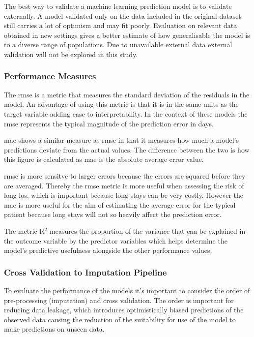 \documentclass[11pt]{article}
\begin{document}
The best way to validate a machine learning prediction model is to validate externally. A model validated only on the data included in the original dataset still carries a lot of optimism and may fit poorly. Evaluation on relevant data obtained in new settings gives a better estimate of how generalisable the model is to a diverse range of populations\cite{Bleeker2003}. Due to unavailable external data external validation will not be explored in this study.

\subsubsection{Performance Measures}

The \gls{rmse} is a metric that measures the standard deviation of the residuals in the model. An advantage of using this metric is that it is in the same units as the target variable adding ease to interpretability. In the context of these models the \gls{rmse} represents the typical magnitude of the prediction error in days\cite{Hodson2022}. 

\gls{mae} shows a similar measure as \gls{rmse} in that it measures how much a model's predictions deviate from the actual values. The difference between the two is how this figure is calculated as \gls{mae} is the absolute average error value. 

\gls{rmse} is more sensitve to larger errors because the errors are squared before they are averaged. Thereby the \gls{rmse} metric is more useful when assessing the risk of long \gls{los}, which is important because long stays can be very costly. However the \gls{mae} is more useful for the aim of estimating the average error for the typical patient because long stays will not so heavily affect the prediction error.

The metric R\(^2\) measures the proportion of the variance that can be explained in the outcome variable by the predictor variables which helps determine the model's predictive usefulness alongside the other performance values\cite{Kim2026}.

\subsubsection{Cross Validation to Imputation Pipeline}
To evaluate the performance of the models it's important to consider the order of pre-processing (imputation) and cross validation. The order is important for reducing data leakage\cite{Dataleakage}, which introduces optimistically biased predictions of the observed data causing the reduction of the suitability for use of the model to make predictions on unseen data.
\end{document}
